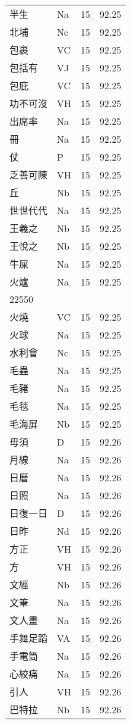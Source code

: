 \documentclass[twocolumn]{book}
\begin{document}
\begin{supertabular}{llrr}
半生 & Na & 15 &  92.25\\
北埔 & Nc & 15 &  92.25\\
包裹 & VC & 15 &  92.25\\
包括有 & VJ & 15 &  92.25\\
包庇 & VC & 15 &  92.25\\
功不可沒 & VH & 15 &  92.25\\
出席率 & Na & 15 &  92.25\\
冊 & Na & 15 &  92.25\\
仗 & P & 15 &  92.25\\
乏善可陳 & VH & 15 &  92.25\\
丘 & Nb & 15 &  92.25\\
世世代代 & Na & 15 &  92.25\\
王羲之 & Nb & 15 &  92.25\\
王悅之 & Nb & 15 &  92.25\\
牛屎 & Na & 15 &  92.25\\
火爐 & Na & 15 &  92.25\\
22550\\
火燒 & VC & 15 &  92.25\\
火球 & Na & 15 &  92.25\\
水利會 & Nc & 15 &  92.25\\
毛蟲 & Na & 15 &  92.25\\
毛豬 & Na & 15 &  92.25\\
毛毯 & Na & 15 &  92.25\\
毛海屏 & Nb & 15 &  92.25\\
毋須 & D & 15 &  92.26\\
月線 & Na & 15 &  92.26\\
日曆 & Na & 15 &  92.26\\
日照 & Na & 15 &  92.26\\
日復一日 & D & 15 &  92.26\\
日昨 & Nd & 15 &  92.26\\
方正 & VH & 15 &  92.26\\
方 & VH & 15 &  92.26\\
文經 & Nb & 15 &  92.26\\
文筆 & Na & 15 &  92.26\\
文人畫 & Na & 15 &  92.26\\
手舞足蹈 & VA & 15 &  92.26\\
手電筒 & Na & 15 &  92.26\\
心絞痛 & Na & 15 &  92.26\\
引人 & VH & 15 &  92.26\\
巴特拉 & Nb & 15 &  92.26\\

\end{supertabular}
\end{document}
